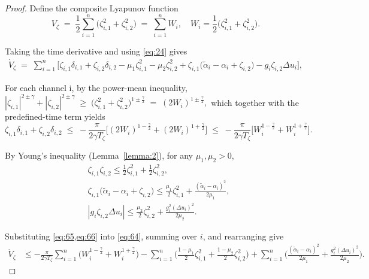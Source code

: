 \documentclass[pdflatex,sn-mathphys-num]{sn-jnl}%
\theoremstyle{thmstyleone}%
\theoremstyle{thmstyletwo}%
\theoremstyle{thmstylethree}%
\begin{document}
\begin{proof}
	Define the composite Lyapunov function
\begin{equation}\label{eq:63}
  V_{\zeta} \;=\; \frac12\sum_{i=1}^{n}\big(\zeta_{i,1}^{2}+\zeta_{i,2}^{2}\big)
  \;=\; \sum_{i=1}^{n} W_i, \quad
  W_i = \frac12\big(\zeta_{i,1}^{2}+\zeta_{i,2}^{2}\big).
\end{equation}

Taking the time derivative and using \cref{eq:24} gives
\begin{equation}\label{eq:64}
\begin{aligned}
  \dot V_{\zeta}
  \;=\; \sum_{i=1}^{n}\Big[
    \zeta_{i,1}\delta_{i,1}+\zeta_{i,2}\delta_{i,2}
    -\mu_{1}\zeta_{i,1}^{2}-\mu_{2}\zeta_{i,2}^{2}
    +\zeta_{i,1}\big(\tilde\alpha_i-\alpha_i+\zeta_{i,2}\big)
    -g_i\zeta_{i,2}\Delta u_i
  \Big],
\end{aligned}
\end{equation}

For each channel i, by the power-mean inequality,
\(
  |\zeta_{i,1}|^{2\pm\gamma}+|\zeta_{i,2}|^{2\pm\gamma}
  \;\ge\;
  \big(\zeta_{i,1}^{2}+\zeta_{i,2}^{2}\big)^{1\pm\frac{\gamma}{2}}
  \;=\; (2W_i)^{1\pm\frac{\gamma}{2}},
\)
which together with the predefined-time term yields
\begin{equation}\label{eq:65}
  \zeta_{i,1}\delta_{i,1}+\zeta_{i,2}\delta_{i,2}
  \;\le\;
  -\frac{\pi}{2\gamma T_{\zeta}}
  \Big[(2W_i)^{1-\frac{\gamma}{2}}+(2W_i)^{1+\frac{\gamma}{2}}\Big]
  \;\le\;
  -\frac{\pi}{2\gamma T_{\zeta}}
  \Big[W_i^{1-\frac{\gamma}{2}}+W_i^{1+\frac{\gamma}{2}}\Big].
\end{equation}

By Young’s inequality (Lemma~\ref{lemma:2}), for any $\mu_{1},\mu_{2}>0$,
\begin{subequations}\label{eq:66}
\begin{align}
	&\zeta_{i,1}\zeta_{i,2}
  \le \tfrac12\zeta_{i,1}^{2}+\tfrac12\zeta_{i,2}^{2},\\
  &\zeta_{i,1}\big(\tilde\alpha_i-\alpha_i+\zeta_{i,2}\big)
 \le \tfrac{\mu_{1}}{2}\zeta_{i,1}^{2}
     +\tfrac{(\tilde\alpha_i-\alpha_i)^{2}}{2\mu_{1}},\\
	 &\left| g_i\zeta_{i,2}\Delta u_i \right|
  \le \tfrac{\mu_{2}}{2}\zeta_{i,2}^{2}
     +\tfrac{g_i^{2}(\Delta u_i)^{2}}{2\mu_{2}}.
\end{align}
\end{subequations}

Substituting \cref{eq:65,eq:66} into \cref{eq:64}, summing over $i$, and rearranging give
\begin{equation}\label{eq:67}
\begin{aligned}
  \dot V_{\zeta}
  &\le
  -\frac{\pi}{2\gamma T_{\zeta}}
   \sum_{i=1}^{n}\Big( W_i^{1-\frac{\gamma}{2}}+W_i^{1+\frac{\gamma}{2}} \Big)
  -\sum_{i=1}^{n}\Big(\tfrac{1-\mu_{1}}{2}\zeta_{i,1}^{2}
  +\tfrac{1-\mu_{2}}{2}\zeta_{i,2}^{2}\Big)
  +\sum_{i=1}^{n}\Big(
  \tfrac{(\tilde\alpha_i-\alpha_i)^{2}}{2\mu_{1}}
  +\tfrac{g_i^{2}(\Delta u_i)^{2}}{2\mu_{2}}\Big).
\end{aligned}
\end{equation}


\end{proof}
\end{document}

